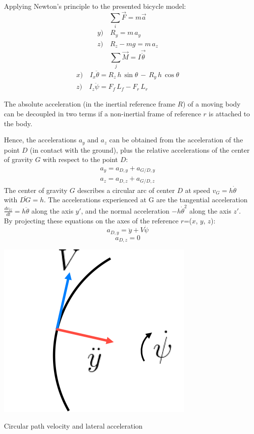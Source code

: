 Applying Newton's principle to the presented bicycle model:\\
	\[\sum_{i} \vec{F}=m\vec{a}\]
\endminipage\hfill
{}
	\begin{eqnarray}
	y) \quad R_{y}=m\,a_{y} \\
	z) \quad R_{z}-mg=m\,a_{z}
	\end{eqnarray}
\endminipage\hfill
{}
	\[\sum_{j} \vec{M}=I\vec{\ddot{\theta}}\]
\endminipage\hfill
{}
	\begin{eqnarray}
	x) \quad I_{x} \ddot{\theta}=R_{z}\,h\,\sin {\theta}\,-\,R_{y}\,h\,\cos {\theta} \\
	z) \quad I_{z} \ddot{\psi}=F_{f}\,L_{f}-F_{r}\,L_{r}
	\end{eqnarray}
\endminipage\hfill

The absolute acceleration (in the inertial reference frame $R$) of a moving body can be decoupled in two terms if a non-inertial frame of reference $r$ is attached to the body. 

Hence, the accelerations $a_{y}$ and $a_{z}$ can be obtained from the acceleration of the point $D$ (in contact with the ground), plus the relative accelerations of the center of gravity $G$ with respect to the point $D$:
\begin{eqnarray}
a_{y}=a_{D,y}+a_{G/D,y}\\
a_{z}=a_{D,z}+a_{G/D,z}
\end{eqnarray}
The center of gravity $G$ describes a circular arc of center $D$ at speed $v_{G}=h\dot{\theta}$ with $\bar{DG}=h$. The accelerations experienced at G are the tangential acceleration $\frac{dv_{G}}{dt}=h\ddot{\theta}$ along the axis $y'$, and the normal acceleration $-h\dot{\theta}^2$ along the axis $z'$.
By projecting these equations on the axes of the reference $r$=($x$, $y$, $z$):
\[a_{D,y}=\ddot{y}+V \dot{\psi}\]
\[a_{D,z}=0\]
\begin{marginfigure}[-3cm]
	\includegraphics[width=0.8\linewidth]{figs/02/circular}
	\caption{Circular path velocity and lateral acceleration}
\end{marginfigure}

